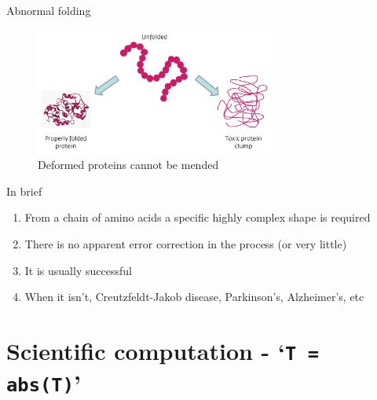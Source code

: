\documentclass[xcolor=dvipsnames]{beamer}
\begin{document}
\begin{frame}{Abnormal folding}
\begin{figure}
  \centering
  \caption {Deformed proteins cannot be mended}
  \includegraphics[width=0.7\textwidth]{protein_abnormal_folding}
\end{figure}
\end{frame}


\begin{frame}{In brief}
  \begin{enumerate}
  \item From a chain of amino acids a specific highly complex shape is required\vspace{5mm}
  \item There is no apparent error correction in the process (or very little)\vspace{5mm}
  \item It is usually successful\vspace{5mm}
  \item When it isn't, Creutzfeldt-Jakob disease, Parkinson’s, Alzheimer’s, etc\vspace{5mm}
  \end{enumerate}
\end{frame}


\section{Scientific computation - `\texttt{T = abs(T)}'}
\end{document}
